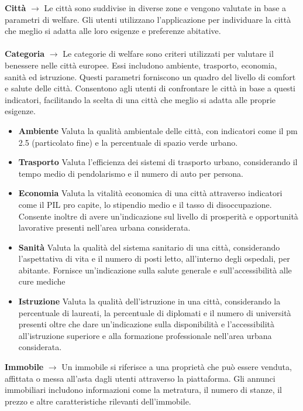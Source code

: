 \documentclass[a4paper,12pt]{report}
\begin{document}
        {\Large \textbf{Città}} $\rightarrow$ Le città sono suddivise in diverse zone e vengono valutate in base a parametri di welfare. Gli utenti utilizzano l'applicazione per individuare la città che meglio si adatta alle loro esigenze e preferenze abitative. \\
        \\
        {\Large \textbf{Categoria}} $\rightarrow$ Le categorie di welfare sono criteri utilizzati per valutare il benessere nelle città europee. Essi includono ambiente, trasporto, economia, sanità ed istruzione. Questi parametri forniscono un quadro del livello di comfort e salute delle città. Consentono agli utenti di confrontare le città in base a questi indicatori, facilitando la scelta di una città che meglio si adatta alle proprie esigenze.
            \begin{itemize}
                \item \textbf{Ambiente}
                            Valuta la qualità ambientale delle città, con indicatori come il pm 2.5 (particolato fine) e la percentuale di spazio verde urbano.
                \item \textbf{Trasporto} 
                            Valuta l'efficienza dei sistemi di trasporto urbano, considerando il tempo medio di pendolarismo e il numero di auto per persona.
                \item \textbf{Economia} 
                            Valuta la vitalità economica di una città attraverso indicatori come il PIL pro capite, lo stipendio medio e il tasso di disoccupazione. Consente inoltre di avere un'indicazione sul livello di prosperità e opportunità lavorative presenti nell'area urbana considerata.
                \item \textbf{Sanità}
                            Valuta la qualità del sistema sanitario di una città, considerando l'aspettativa di vita e il numero di posti letto, all'interno degli ospedali, per abitante. Fornisce un'indicazione sulla salute generale e sull'accessibilità alle cure mediche
                \item \textbf{Istruzione} 
                            Valuta la qualità dell'istruzione in una città, considerando la percentuale di laureati, la percentuale di diplomati e il numero di università presenti oltre che dare un'indicazione sulla disponibilità e l'accessibilità all'istruzione superiore e alla formazione professionale nell'area urbana considerata.
                \end{itemize} 
        {\Large \textbf{Immobile}} $\rightarrow$ Un immobile si riferisce a una proprietà che può essere venduta, affittata o messa all'asta dagli utenti attraverso la piattaforma. Gli annunci immobiliari includono informazioni come la metratura, il numero di stanze, il prezzo e altre caratteristiche rilevanti dell'immobile. \\
\end{document}
